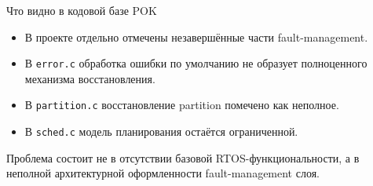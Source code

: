 \begin{frame}{Что видно в кодовой базе POK}
	\begin{itemize}
		\item В проекте отдельно отмечены незавершённые части fault-management.
		\item В \texttt{error.c} обработка ошибки по умолчанию не образует полноценного механизма восстановления.
		\item В \texttt{partition.c} восстановление partition помечено как неполное.
		\item В \texttt{sched.c} модель планирования остаётся ограниченной.
	\end{itemize}
	
	\vspace{0.3cm}	
	Проблема состоит не в отсутствии базовой RTOS-функциональности, а в неполной архитектурной оформленности fault-management слоя.
\end{frame}